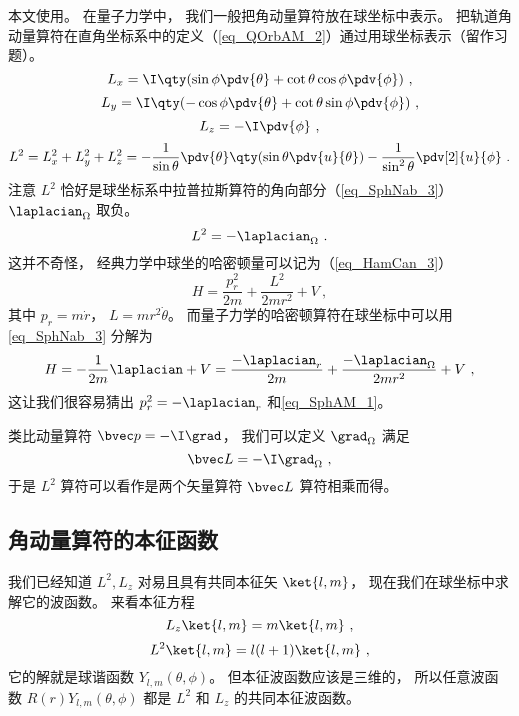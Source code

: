 

本文使用。 在量子力学中， 我们一般把角动量算符放在球坐标中表示。 把轨道角动量算符在直角坐标系中的定义（\autoref{eq_QOrbAM_2}）通过用球坐标表示（留作习题）。
\begin{equation}
L_x = \I \qty(\sin\phi\pdv{\theta} + \cot\theta\cos\phi\pdv{\phi})~,
\end{equation}
\begin{equation}
L_y = \I \qty(-\cos\phi\pdv{\theta} + \cot\theta \sin\phi \pdv{\phi})~,
\end{equation}
\begin{equation}
L_z = -\I\pdv{\phi}~,
\end{equation}
\begin{equation}
L^2 = L_x^2 + L_y^2 + L_z^2 = -\frac{1}{\sin\theta}\pdv{\theta} \qty(\sin \theta \pdv{u}{\theta}) - \frac{1}{\sin^2 \theta} \pdv[2]{u}{\phi}~.
\end{equation}
注意 $L^2$ 恰好是球坐标系中拉普拉斯算符的角向部分（\autoref{eq_SphNab_3}） $\laplacian_\Omega$ 取负。
\begin{equation}\label{eq_SphAM_1}
L^2 = -\laplacian_\Omega~.
\end{equation}
这并不奇怪， 经典力学中球坐的哈密顿量可以记为（\autoref{eq_HamCan_3}）
\begin{equation}
H = \frac{p_r^2}{2m} + \frac{L^2}{2mr^2} + V~,
\end{equation}
其中 $p_r = m\dot r$， $L = mr^2\dot\theta$。 而量子力学的哈密顿算符在球坐标中可以用\autoref{eq_SphNab_3} 分解为
\begin{equation}
H = -\frac{1}{2m}\laplacian + V = \frac{-\laplacian_r}{2m} +\frac{-\laplacian_\Omega}{2mr^2} + V~,
\end{equation}
这让我们很容易猜出 $p_r^2 = -\laplacian_r$ 和\autoref{eq_SphAM_1}。

类比动量算符 $\bvec p = -\I \grad$， 我们可以定义 $\grad_\Omega$ 满足
\begin{equation}
\bvec L = -\I \grad_\Omega~,
\end{equation}
于是 $L^2$ 算符可以看作是两个矢量算符 $\bvec L$ 算符相乘而得。

\subsection{角动量算符的本征函数}
我们已经知道 $L^2, L_z$ 对易且具有共同本征矢 $\ket{l, m}$， 现在我们在球坐标中求解它的波函数。 来看本征方程
\begin{equation}
L_z \ket{l, m} = m\ket{l, m}~,
\end{equation}
\begin{equation}
L^2 \ket{l, m} = l(l+1)\ket{l, m}~,
\end{equation}
它的解就是球谐函数 $Y_{l,m}(\theta,\phi)$。 但本征波函数应该是三维的， 所以任意波函数 $R(r)Y_{l,m}(\theta, \phi)$ 都是 $L^2$ 和 $L_z$ 的共同本征波函数。
